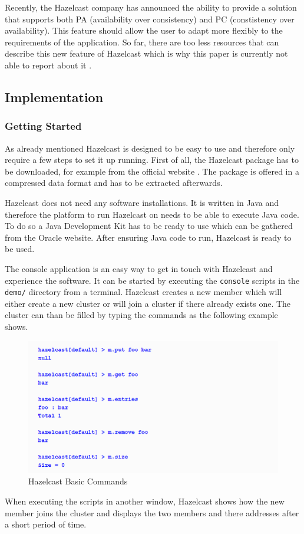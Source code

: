 Recently, the Hazelcast company has announced the ability to provide a solution that supports both PA (availability over consistency) and PC (constistency over availability). This feature should allow the user to adapt more flexibly to the requirements of the application. So far, there are too less resources that can describe this new feature of Hazelcast which is why this paper is currently not able to report about it \parencite{hazelcastCAP}.

\subsection{Implementation}
\subsubsection*{Getting Started}
As already mentioned Hazelcast is designed to be easy to use and therefore only require a few steps to set it up running.
First of all, the Hazelcast package has to be downloaded, for example from the official website \parencite{hazelcast:hazelcastDownload}. The package is offered in a compressed data format and has to be extracted afterwards.

Hazelcast does not need any software installations. It is written in Java and therefore the platform to run Hazelcast on needs to be able to execute Java code. To do so a Java Development Kit has to be ready to use which can be gathered from the Oracle website. After ensuring Java code to run, Hazelcast is ready to be used.

The console application is an easy way to get in touch with Hazelcast and experience the software. It can be started by executing the \texttt{console} scripts in the \texttt{demo/} directory from a terminal. Hazelcast creates a new member which will either create a new cluster or will join a cluster if there already exists one. The cluster can than be filled by typing the commands as the following example shows.
\begin{flushleft}
\begin{figure}[h]
    \includegraphics{img/hazelcastPut.PNG} 
    \caption{Hazelcast Basic Commands \parencite{johns2015}}
\end{figure}
\end{flushleft}
When executing the scripts in another window, Hazelcast shows how the new member joins the cluster and displays the two members and there addresses after a short period of time.


